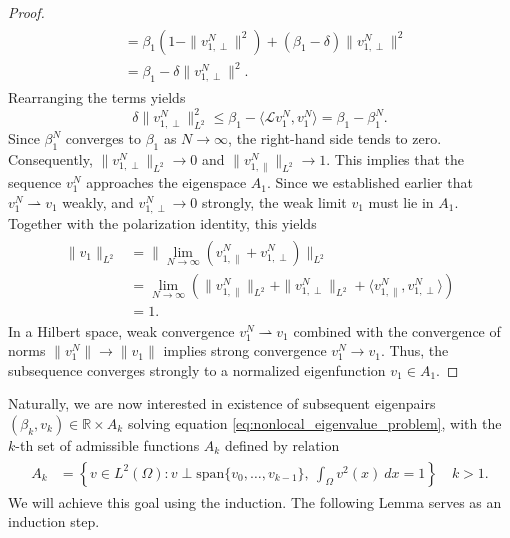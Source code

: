 \documentclass[11pt, a4paper]{article}
\theoremstyle{break}
\theoremstyle{break}
\theoremstyle{break}
\theoremstyle{break}
\theoremstyle{break}
\theoremstyle{break}
\theoremstyle{break}
\theoremstyle{break}
\theoremstyle{break}
\begin{document}
\begin{proof}
\begin{align}
\begin{split}
            &= \beta_1 (1 - \|v_{1, \perp}^{N}\|^2) + (\beta_1 - \delta) \|v_{1, \perp}^{N}\|^2 \\
            &= \beta_1 - \delta \|v_{1, \perp}^{N}\|^2.
        \end{split}
    \end{align}
    Rearranging the terms yields
    \begin{equation}
        \delta \|v_{1, \perp}^{N}\|_{L^2}^2 \leq \beta_1 - \langle \mathcal{L} v_1^N, v_1^N \rangle = \beta_1 - \beta_1^N.
    \end{equation}
    Since $\beta_1^N$ converges to $\beta_1$ as $N \to \infty$, the right-hand side tends to zero. Consequently, $\|v_{1, \perp}^{N}\|_{L^2} \to 0$ and $\|v_{1, \parallel}^{N}\|_{L^2} \to 1$. This implies that the sequence $v_1^N$ approaches the eigenspace $A_1$.  Since we established earlier that $v_1^N \rightharpoonup v_1$ weakly, and $v_{1, \perp}^{N} \to 0$ strongly, the weak limit $v_1$ must lie in $A_1$. Together with the polarization identity, this yields
    \begin{align}
        \begin{split}
            \|v_1\|_{L^2} 
            &= 
            \|\lim_{N \to \infty} (v_{1, \parallel}^{N} + v_{1, \perp}^N)\|_{L^2} \\
            &=
            \lim_{N \to \infty} \left(\|v_{1, \parallel}^{N}\|_{L^2} + \| v_{1, \perp}^N\|_{L^2} + \langle v_{1, \parallel}^N, v_{1, \perp}^N \rangle \right) \\
            &=
            1.
        \end{split}
    \end{align}
    In a Hilbert space, weak convergence $v_1^N \rightharpoonup v_1$ combined with the convergence of norms $\|v_1^N\| \to \|v_1\|$ implies strong convergence $v_1^N \to v_1$. Thus, the subsequence converges strongly to a normalized eigenfunction $v_1 \in A_1$.
\end{proof}

Naturally, we are now interested in existence of subsequent eigenpairs $(\beta_k, v_k) \in \mathbb{R}\times A_k$ solving equation \eqref{eq:nonlocal_eigenvalue_problem}, with the $k$-th set of admissible functions $A_k$ defined by relation
\begin{align}
    \begin{split}
        A_k &= \left\{ v \in L^2(\Omega): v \perp \text{span}\{v_0, \ldots, v_{k-1}\}, \: \int_\Omega v^2(x) \: dx = 1 \right\} \quad k > 1.
    \end{split}
\end{align}
We will achieve this goal using the induction. The following Lemma serves as an induction step.
\end{document}
